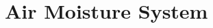 \documentclass[../main]{subfiles}
\begin{document}
\chapter{Air Moisture System} \label{chp:humeSubsystem}






\end{document}
